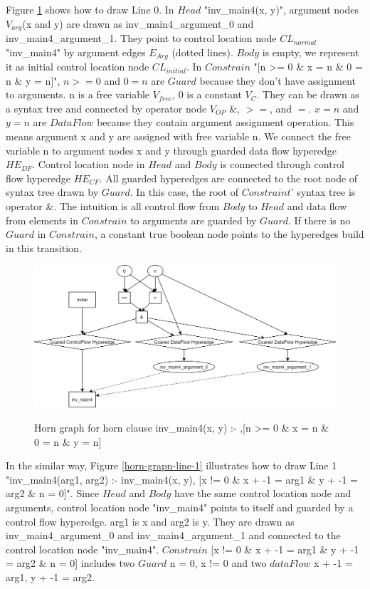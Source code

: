 \documentclass{article}
\begin{document}
Figure \ref{horn-grapn-line-0} shows how to draw Line 0. In $Head$ "inv\_main4(x, y)", argument nodes $V_{arg} $(x and y) are drawn as inv\_main4\_argument\_0 and inv\_main4\_argument\_1. They point to control location node $CL_{normal}$ "inv\_main4" by argument edges $E_{Arg}$ (dotted lines). $Body$ is empty, we represent it as initial control location node $CL_{initial}$. In $Constrain$ "[n >= 0 \& x = n \& 0 = n \& y = n]",  $n >= 0$ and $0 = n$ are $Guard$ because they don't have assignment to arguments. n is a free variable $V_{free}$, 0 is a constant $V_{C}$. They can be drawn as a syntax tree and connected by operator node $V_{OP}$ $\&$, $>=$, and $=$. $x = n$ and $y = n$ are $DataFlow$ because they contain argument assignment operation. This means argument x and y are assigned with free variable n. We connect the free variable n to argument nodes x and y through guarded data flow hyperedge $HE_{DF}$. Control location node in $Head$ and $Body$ is connected through control flow hyperedge $HE_{CF}$. All guarded hyperedges are connected to the root node of syntax tree drawn by $Guard$.  In this case, the root of $Constraint$' syntax tree is operator $\&$. The intuition is all control flow from $Body$ to $Head$ and data flow from elements in $Constrain$ to arguments are guarded by $Guard$. If there is no $Guard$ in $Constrain$, a constant true boolean node points to the hyperedges build in this transition.

\begin{figure}[h]
\centering
  \includegraphics[width=14cm]{graph/horn-grapn-line-0}\\
  \caption{Horn graph for horn clause inv\_main4(x, y) :- ,[n >= 0 \& x = n \& 0 = n \& y = n]}\label{horn-grapn-line-0}
\end{figure}

In the similar way, Figure \ref{horn-grapn-line-1} illustrates how to draw Line 1 "inv\_main4(arg1, arg2) :- inv\_main4(x, y), [x != 0 \& x + -1 = arg1 \& y + -1 = arg2 \& n = 0]". Since $Head$ and $Body$ have the same control location node and arguments, control location node "inv\_main4" points to itself and guarded by a control flow hyperedge. arg1 is x and arg2 is y. They are drawn as inv\_main4\_argument\_0 and inv\_main4\_argument\_1 and connected to the control location node "inv\_main4". $Constrain$ [x != 0 \& x + -1 = arg1 \& y + -1 = arg2 \& n = 0] includes two $Guard$ n = 0, x != 0 and two $dataFlow$ x + -1 = arg1, y + -1 = arg2.
\end{document}
